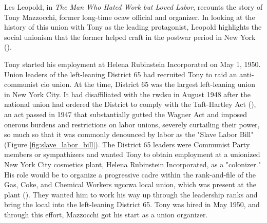 \documentclass[12pt]{article}
\begin{document}
Les Leopold, in \textit{The Man Who Hated Work but Loved Labor}, recounts the story of Tony Mazzocchi, former long-time \acrfull{ocaw} official and organizer. In looking at the history of this union with Tony as the leading protagonist, Leopold highlights the social unionism that the former helped craft in the postwar period in New York (\cite[16]{leopoldManWhoHated2007}).

Tony started his employment at Helena Rubinstein Incorporated on May 1, 1950. Union leaders of the left-leaning District 65 had recruited Tony to raid an anti-communist \acrshort{cio} union. At the time, District 65 was the largest left-leaning union in New York City. It had disaffiliated with the \acrfull{rwdsu} in August 1948 after the national union had ordered the District to comply with the Taft-Hartley Act (\cite{leopoldManWhoHated2007}), an act passed in 1947 that substantially gutted the Wagner Act and imposed onerous burdens and restrictions on labor unions, severely curtailing their power, so much so that it was commonly denounced by labor as the "Slave Labor Bill" (Figure \ref{fig:slave_labor_bill}). The District 65 leaders were Communist Party members or sympathizers and wanted Tony to obtain employment at a unionized New York City cosmetics plant, Helena Rubinstein Incorporated, as a "colonizer." His role would be to organize a progressive cadre within the rank-and-file of the Gas, Coke, and Chemical Workers \acrshort{ugccwa} local union, which was present at the plant (\cite[71]{leopoldManWhoHated2007}). They wanted him to work his way up through the leadership ranks and bring the local into the left-leaning District 65. Tony was hired in May 1950, and through this effort, Mazzocchi got his start as a union organizer.
\end{document}
